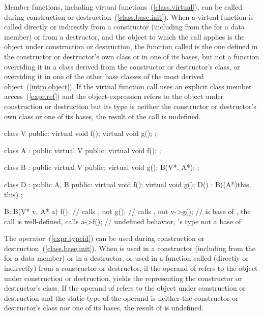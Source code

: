 \pnum
{}%
%
%
%
Member functions, including virtual functions~(\ref{class.virtual}), can be called
during construction or destruction~(\ref{class.base.init}).
When a virtual function is called directly or indirectly from a constructor
(including from the  for a data member)
or from a destructor,
and the object to which the call applies is the object under construction or
destruction,
the function called is the one defined
in the constructor or destructor's own class or in one of its bases, but not
a function
overriding it in a class derived from the constructor or destructor's class,
or overriding it in one of the other base classes of the most derived
object~(\ref{intro.object}).
If the virtual function call uses an explicit class member access~(\ref{expr.ref})
and the object-expression refers to the
object under construction or destruction but its type is neither the
constructor or destructor's own class or one of its bases, the result of the
call is undefined.
\enterexample

\begin{codeblock}
class V {
public:
	virtual void f();
	virtual void g();
};

class A : public virtual V {
public:
	virtual void f();
};

class B : public virtual V {
public:
	virtual void g();
	B(V*, A*);
};

class D : public A, B {
public:
	virtual void f();
	virtual void g();
	D() : B((A*)this, this) { }
};

B::B(V* v, A* a) {
	f();              // calls , not 
	g();              // calls , not 
	v->g();           //  is base of , the call is well-defined, calls 
	a->f();           // undefined behavior, 's type not a base of 
}
\end{codeblock}
\exitexampleb

\pnum
{}%
%
%
%
The
operator~(\ref{expr.typeid}) can be used during construction or destruction~(\ref{class.base.init}).
When
is used in a constructor (including from the
for a data member)
or in a destructor, or used in a function called (directly or indirectly) from
a constructor or destructor, if the operand of
refers to the object under construction or destruction,
yields the
representing the constructor or destructor's class.
If the operand of
refers to the object under construction or destruction and the static type of
the operand is neither the constructor or destructor's class nor one of its
bases, the result of
is undefined.

